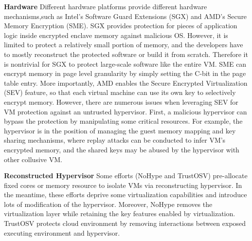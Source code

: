 \documentclass[conference]{IEEEtran}
\begin{document}
\textbf{Hardware}
Different hardware platforms provide different hardware mechanisms,such as Intel's Software Guard Extensions (SGX) and AMD's Secure Memory Encryption (SME)\cite{WuLLCZG18}.
SGX provides protection for pieces of application logic inside encrypted enclave memory against malicious OS. However, it is limited to protect a relatively small portion
of memory, and the developers have to mostly reconstruct the protected software or build it from scratch. Therefore it is nontrivial for SGX to protect large-scale software like the entire VM. 
SME can encrypt memory in page level granularity by simply setting the C-bit
in the page table entry. More importantly, AMD enables the Secure Encrypted Virtualization (SEV) feature, so that each virtual machine can use its own key to selectively encrypt memory.
However, there are numerous issues when leveraging SEV for VM protection against an untrusted hypervisor. First, a malicious hypervisor can bypass the protection by manipulating some critical resources. For example, the hypervisor is in the position of managing the guest memory mapping and key sharing mechanisms, where replay attacks can be conducted to infer VM's encrypted memory, and the shared keys may be abused by the hypervisor with other collusive VM.



\textbf{Reconstructed Hypervisor }
Some efforts (NoHype\cite{NoHype} and TrustOSV\cite{TrustOSV}) pre-allocate fixed cores or memory resource to isolate VMs via reconstructing hypervisor. In the meantime, these efforts deprive some virtualization capabilities and introduce lots of modification of the hypervisor. Moreover, NoHype removes the virtualization layer while retaining the key features enabled by virtualization. TrustOSV protects cloud environment by removing interactions between exposed executing environment and hypervisor.
\end{document}

